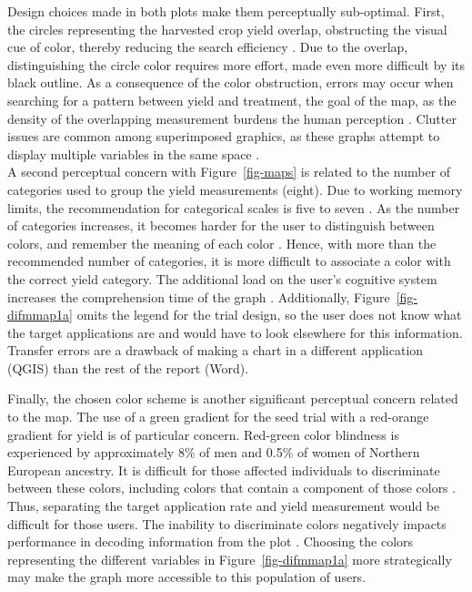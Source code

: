 \documentclass[
  authoryear,
  preprint,
  3p]{elsarticle}
\begin{document}
Design choices made in both plots make them perceptually sub-optimal.
First, the circles representing the harvested crop yield overlap,
obstructing the visual cue of color, thereby reducing the search
efficiency \citep{BRAVO2004b, BRAVO2004a}. Due to the overlap,
distinguishing the circle color requires more effort, made even more
difficult by its black outline. As a consequence of the color
obstruction, errors may occur when searching for a pattern between yield
and treatment, the goal of the map, as the density of the overlapping
measurement burdens the human perception \citep{huang2009}. Clutter
issues are common among superimposed graphics, as these graphs attempt
to display multiple variables in the same space \citep{gleicher2011}.\\
A second perceptual concern with Figure~\ref{fig-maps} is related to the
number of categories used to group the yield measurements (eight). Due
to working memory limits, the recommendation for categorical scales is
five to seven \citep{Miller1956TheMN, SILVA2011320}. As the number of
categories increases, it becomes harder for the user to distinguish
between colors, and remember the meaning of each color
\citep{macdonald_1999}. Hence, with more than the recommended number of
categories, it is more difficult to associate a color with the correct
yield category. The additional load on the user's cognitive system
increases the comprehension time of the graph \citep{huang2009}.
Additionally, Figure~\ref{fig-difmmap1a} omits the legend for the trial
design, so the user does not know what the target applications are and
would have to look elsewhere for this information. Transfer errors are a
drawback of making a chart in a different application (QGIS) than the
rest of the report (Word).

Finally, the chosen color scheme is another significant perceptual
concern related to the map. The use of a green gradient for the seed
trial with a red-orange gradient for yield is of particular concern.
Red-green color blindness is experienced by approximately 8\% of men and
0.5\% of women of Northern European ancestry. It is difficult for those
affected individuals to discriminate between these colors, including
colors that contain a component of those colors \citep{wong2011color}.
Thus, separating the target application rate and yield measurement would
be difficult for those users. The inability to discriminate colors
negatively impacts performance in decoding information from the plot
\citep{SILVA2011320}. Choosing the colors representing the different
variables in Figure~\ref{fig-difmmap1a} more strategically may make the
graph more accessible to this population of users.
\end{document}
